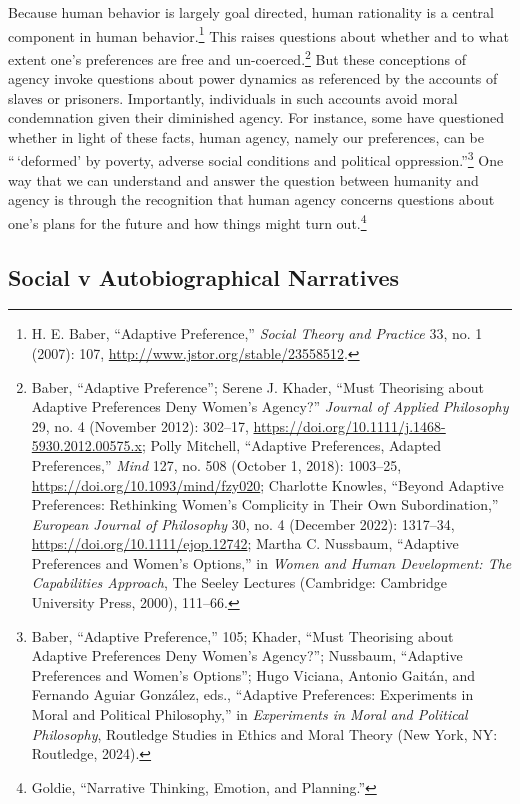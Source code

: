 \documentclass[phdthesis,12pt,final]{wuthesis}
\theoremstyle{definition}
\theoremstyle{definition}
\theoremstyle{definition}
\theoremstyle{definition}
\theoremstyle{remark}
\begin{document}
Because human behavior is largely goal directed, human rationality is a central component in human behavior.\footnote{H. E. Baber, {``Adaptive {Preference},''} \emph{Social Theory and Practice} 33, no. 1 (2007): 107, \url{http://www.jstor.org/stable/23558512}.} This raises questions about whether and to what extent one's preferences are free and un-coerced.\footnote{Baber, {``Adaptive {Preference}''}; Serene J. Khader, {``Must {Theorising} about {Adaptive Preferences Deny Women}'s {Agency}?''} \emph{Journal of Applied Philosophy} 29, no. 4 (November 2012): 302--17, \url{https://doi.org/10.1111/j.1468-5930.2012.00575.x}; Polly Mitchell, {``Adaptive {Preferences}, {Adapted Preferences},''} \emph{Mind} 127, no. 508 (October 1, 2018): 1003--25, \url{https://doi.org/10.1093/mind/fzy020}; Charlotte Knowles, {``Beyond Adaptive Preferences: {Rethinking} Women's Complicity in Their Own Subordination,''} \emph{European Journal of Philosophy} 30, no. 4 (December 2022): 1317--34, \url{https://doi.org/10.1111/ejop.12742}; Martha C. Nussbaum, {``Adaptive {Preferences} and {Women}'s {Options},''} in \emph{Women and Human Development: {The} Capabilities Approach}, The Seeley Lectures (Cambridge: Cambridge University Press, 2000), 111--66.} But these conceptions of agency invoke questions about power dynamics as referenced by the accounts of slaves or prisoners. Importantly, individuals in such accounts avoid moral condemnation given their diminished agency. For instance, some have questioned whether in light of these facts, human agency, namely our preferences, can be ``\,`deformed' by poverty, adverse social conditions and political oppression.''\footnote{Baber, {``Adaptive {Preference},''} 105; Khader, {``Must {Theorising} about {Adaptive Preferences Deny Women}'s {Agency}?''}; Nussbaum, {``Adaptive {Preferences} and {Women}'s {Options}''}; Hugo Viciana, Antonio Gaitán, and Fernando Aguiar González, eds., {``Adaptive {Preferences}: {Experiments} in {Moral} and {Political Philosophy},''} in \emph{Experiments in Moral and Political Philosophy}, Routledge Studies in Ethics and Moral Theory (New York, NY: Routledge, 2024).} One way that we can understand and answer the question between humanity and agency is through the recognition that human agency concerns questions about one's plans for the future and how things might turn out.\footnote{Goldie, {``Narrative {Thinking}, {Emotion}, and {Planning}.''}}

\subsection*{Social v Autobiographical Narratives}\label{social-v-autobiographical-narratives}
\end{document}
